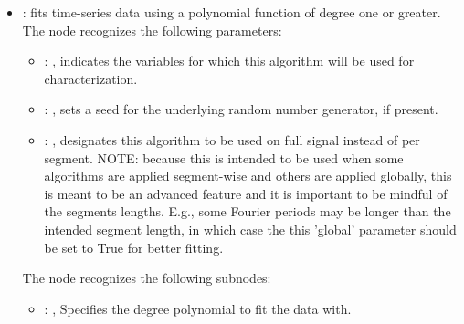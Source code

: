 \begin{itemize}
    \item {}:
      fits time-series data using a polynomial function of degree one or greater.
      The  node recognizes the following parameters:
        \begin{itemize}
          \item {}: , 
            indicates the variables for which this algorithm will be used for characterization.
          \item {}: , 
            sets a seed for the underlying random number generator, if present.
          \item {}: , 
            designates this algorithm to be used on full signal instead of per
            segment. NOTE: because this is intended to be used when some algorithms are
            applied segment-wise and others are applied globally, this is meant to be an
            advanced feature and it is important to be mindful of the segments lengths.
            E.g., some Fourier periods may be longer than the intended segment length, in
            which case the this 'global' parameter should be set to True for better
            fitting. 
      \end{itemize}

      The  node recognizes the following subnodes:
      \begin{itemize}
        \item {}: , 
          Specifies the degree polynomial to fit the data with.
      \end{itemize}


\end{itemize}
